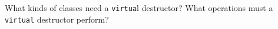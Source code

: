 %
%
\begin{question}
What kinds of classes need a \verb|virtua|l destructor? What
operations must a \verb|virtual| destructor perform?
\end{question}
